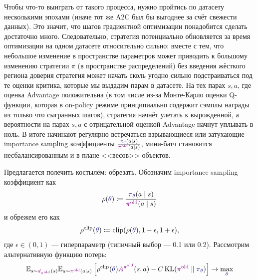 Чтобы что-то выиграть от такого процесса, нужно пройтись по датасету несколькими эпохами (иначе тот же A2C был бы выгоднее за счёт свежести данных). Это значит, что шагов градиентной оптимизации понадобится сделать достаточно много. Следовательно, стратегия потенциально обновляется за время оптимизации на одном датасете относительно сильно: вместе с тем, что небольшое изменение в пространстве параметров может приводить к большому изменению стратегии $\pi$ (в пространстве распределений) без введения жёсткого региона доверия стратегия может начать сколь угодно сильно подстраиваться под те оценки критика, которые мы выдадим парам в датасете. На тех парах $s, a$, где оценка Advantage положительна (в том числе из-за Монте-Карло оценки Q-функции, которая в on-policy режиме принципиально содержит сэмплы награды из только что сыгранных шагов), стратегия начнёт улетать к вырожденной, а вероятности на парах $s, a$ с отрицательной оценкой Advantage начнут уплывать в ноль. В итоге начинают регулярно встречаться взрывающиеся или затухающие importance sampling коэффициенты $\frac{\textcolor{ChadBlue}{\pi_\theta}(a \mid s)}{\textcolor{ChadPurple}{\pi^{\old}}(a \mid s)}$, мини-батч становится несбалансированным и в плане <<весов>> объектов.

Предлагается полечить костылём: обрезать. Обозначим importance sampling коэффициент как
$$\rho(\textcolor{ChadBlue}{\theta}) \coloneqq \frac{\textcolor{ChadBlue}{\pi_\theta}(a \mid s)}{\textcolor{ChadPurple}{\pi^{\old}}(a \mid s)}$$
и обрежем его как
$$\rho^{\clip}(\textcolor{ChadBlue}{\theta}) \coloneqq \clip(\rho(\textcolor{ChadBlue}{\theta}), 1 - \epsilon, 1 + \epsilon),$$
где $\epsilon \in (0, 1)$ --- гиперпараметр (типичный выбор --- 0.1 или 0.2). Рассмотрим альтернативную функцию потерь:
\begin{equation*}
\E_{s \sim \textcolor{ChadPurple}{d_{\pi^{\old}}}(s)} \E_{a \sim \textcolor{ChadPurple}{\pi^{\old}}(a \mid s)} \left[ \rho^{\clip}(\textcolor{ChadBlue}{\theta}) \textcolor{ChadPurple}{A^{\pi^{\old}}}(s, a) - C \KL(\textcolor{ChadPurple}{\pi^{\old}} \parallel \textcolor{ChadBlue}{\pi_\theta}) \right] \to \max_{\textcolor{ChadBlue}{\theta}}
\end{equation*}

